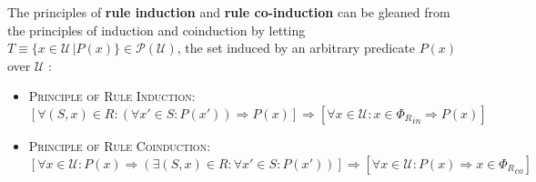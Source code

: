 



The principles of \textbf{rule induction} and \textbf{rule co-induction} can be gleaned from the principles of induction and coinduction by letting $T \equiv \{x \in \mathcal{U} \,| P(x)\} \in \mathcal{P}(\mathcal{U})$, the set induced by an arbitrary predicate $P(x)$ over $\mathcal{U}$ \cite{Pierce2002}:

\begin{itemize}
\item \textsc{Principle of Rule Induction}: $$[\forall (S,x) \in R: (\forall x' \in S: P(x')) \Rightarrow P(x)] \Rightarrow [\forall x \in \mathcal{U}: x \in {\Phi_R}_{in} \Rightarrow P(x)]$$
\item \textsc{Principle of Rule Coinduction}: $$[\forall x \in \mathcal{U}: P(x) \Rightarrow (\exists (S,x) \in R: \forall x' \in S: P(x'))] \Rightarrow [\forall x \in \mathcal{U}: P(x) \Rightarrow x \in {\Phi_R}_{co}]$$
\end{itemize}

